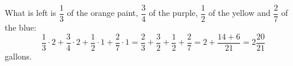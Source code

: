 What is left is $\dfrac{1}{3}$ of the orange paint, $\dfrac{3}{4}$ of the purple, $\dfrac{1}{2}$ of the yellow and $\dfrac{2}{7}$ of the blue:
\[
\dfrac{1}{3}\cdot2+\dfrac{3}{4}\cdot2+\dfrac{1}{2}\cdot1+\dfrac{2}{7}\cdot1=\dfrac{2}{3}+\dfrac{3}{2}+\dfrac{1}{2}+\dfrac{2}{7}=2+\dfrac{14+6}{21}=\boxed{2\dfrac{20}{21}}
\]
gallons.
